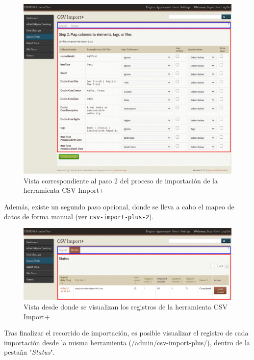 \documentclass[
]{article}
\begin{document}
\begin{figure}
\hypertarget{csv-import-plus-2}{%
\centering
\includegraphics{../_static/images/csv-import-plus-2.png}
\caption{Vista correspondiente al paso 2 del proceso de importación de
la herramienta CSV Import+}\label{csv-import-plus-2}
}
\end{figure}

Además, existe un segundo paso opcional, donde se lleva a cabo el mapeo
de datos de forma manual (ver \texttt{csv-import-plus-2}).

\begin{figure}
\hypertarget{csv-import-plus-status}{%
\centering
\includegraphics{../_static/images/csv-import-plus-status.png}
\caption{Vista desde donde se visualizan los registros de la herramienta
CSV Import+}\label{csv-import-plus-status}
}
\end{figure}

Tras finalizar el recorrido de importación, es posible visualizar el
registro de cada importación desde la misma herramienta
({/admin/csv-import-plus/}), dentro de la pestaña "\emph{Status}".
\end{document}
